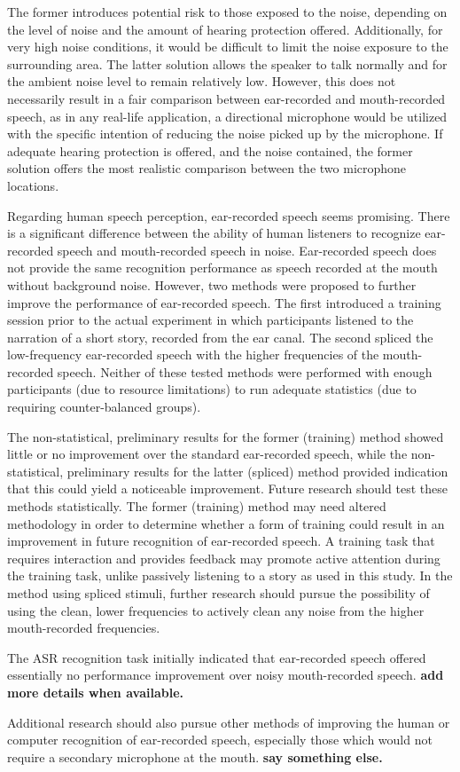 The former introduces potential risk to those exposed to the noise, depending on the level of noise and the amount of hearing protection offered.  Additionally, for very high noise conditions, it would be difficult to limit the noise exposure to the surrounding area.  The latter solution allows the speaker to talk normally and for the ambient noise level to remain relatively low.  However, this does not necessarily result in a fair comparison between ear-recorded and mouth-recorded speech, as in any real-life application, a directional microphone would be utilized with the specific intention of reducing the noise picked up by the microphone.  If adequate hearing protection is offered, and the noise contained, the former solution offers the most realistic comparison between the two microphone locations.

Regarding human speech perception, ear-recorded speech seems promising.  There is a significant difference between the ability of human listeners to recognize ear-recorded speech and mouth-recorded speech in noise.  Ear-recorded speech does not provide the same recognition performance as speech recorded at the mouth without background noise.  However, two methods were proposed to further improve the performance of ear-recorded speech.  The first introduced a training session prior to the actual experiment in which participants listened to the narration of a short story, recorded from the ear canal.  The second spliced the low-frequency ear-recorded speech with the higher frequencies of the mouth-recorded speech.  Neither of these tested methods were performed with enough participants (due to resource limitations) to run adequate statistics (due to requiring counter-balanced groups).  

The non-statistical, preliminary results for the former (training) method showed little or no improvement over the standard ear-recorded speech, while the non-statistical, preliminary results for the latter (spliced) method provided indication that this could yield a noticeable improvement.  Future research should test these methods statistically.  The former (training) method may need altered methodology in order to determine whether a form of training could result in an improvement in future recognition of ear-recorded speech.  A training task that requires interaction and provides feedback may promote active attention during the training task, unlike passively listening to a story as used in this study.  In the method using spliced stimuli, further research should pursue the possibility of using the clean, lower frequencies to actively clean any noise from the higher mouth-recorded frequencies.  

The ASR recognition task initially indicated that ear-recorded speech offered essentially no performance improvement over noisy mouth-recorded speech. \textbf{add more details when available.}

Additional research should also pursue other methods of improving the human or computer recognition of ear-recorded speech, especially those which would not require a secondary microphone at the mouth. \textbf{say something else.}



